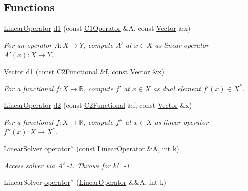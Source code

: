 \subsection*{\-Functions}
\begin{DoxyCompactItemize}
\item 
\hyperlink{classSpacy_1_1LinearOperator}{\-Linear\-Operator} \hyperlink{namespaceSpacy_a2205e2a2c4bb5242665bbc09929d35d2}{d1} (const \hyperlink{classSpacy_1_1C1Operator}{\-C1\-Operator} \&\-A, const \hyperlink{classSpacy_1_1Vector}{\-Vector} \&x)
\begin{DoxyCompactList}\small\item\em \-For an operator $ A: X\to Y $, compute $A'$ at $x\in X$ as linear operator $ A'(x): X \to Y $. \end{DoxyCompactList}\item 
\hyperlink{classSpacy_1_1Vector}{\-Vector} \hyperlink{namespaceSpacy_ab6646eb7068eb9f1369e639cf0b620a2}{d1} (const \hyperlink{classSpacy_1_1C2Functional}{\-C2\-Functional} \&f, const \hyperlink{classSpacy_1_1Vector}{\-Vector} \&x)
\begin{DoxyCompactList}\small\item\em \-For a functional $ f: X\to \mathbb{R} $, compute $f'$ at $x\in X$ as dual element $ f'(x) \in X^* $. \end{DoxyCompactList}\item 
\hyperlink{classSpacy_1_1LinearOperator}{\-Linear\-Operator} \hyperlink{namespaceSpacy_a569d8fc0b4a0e292f257dd6307a25c8f}{d2} (const \hyperlink{classSpacy_1_1C2Functional}{\-C2\-Functional} \&f, const \hyperlink{classSpacy_1_1Vector}{\-Vector} \&x)
\begin{DoxyCompactList}\small\item\em \-For a functional $ f: X\to \mathbb{R} $, compute $f''$ at $x\in X$ as linear operator $ f''(x): X \to X^* $. \end{DoxyCompactList}\item 
\hypertarget{namespaceSpacy_ab1be097dacbf27785979de79ed5b3178}{\-Linear\-Solver \hyperlink{namespaceSpacy_ab1be097dacbf27785979de79ed5b3178}{operator$^\wedge$} (const \hyperlink{classSpacy_1_1LinearOperator}{\-Linear\-Operator} \&\-A, int k)}\label{namespaceSpacy_ab1be097dacbf27785979de79ed5b3178}

\begin{DoxyCompactList}\small\item\em \-Access solver via \-A$^\wedge$-\/1. \-Throws for k!=-\/1. \end{DoxyCompactList}\item 
\hypertarget{namespaceSpacy_a6defec6ee302bf4c1054afc65c9fcb95}{\-Linear\-Solver \hyperlink{namespaceSpacy_a6defec6ee302bf4c1054afc65c9fcb95}{operator$^\wedge$} (\hyperlink{classSpacy_1_1LinearOperator}{\-Linear\-Operator} \&\&\-A, int k)}\label{namespaceSpacy_a6defec6ee302bf4c1054afc65c9fcb95}


\end{DoxyCompactItemize}
